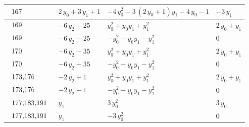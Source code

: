 \begin{table}[H]
\begin{center}
{\begin{tabular}{|l|l|l|l|}
$\begin{tabular}{l}
167 \\
\end{tabular}$ & $ 2 \, y_{0} + 3 \, y_{1} + 1 $ & $ -4 \, y_{0}^{2} - 3 \, {\left(2 \, y_{0} + 1\right)} y_{1} - 4 \, y_{0} - 1 $ & $ -3 \, y_{1} $ \\ \hline
$\begin{tabular}{l}
169 \\
\end{tabular}$ & $ -6 \, y_{2} + 25 $ & $ y_{0}^{2} + y_{0} y_{1} + y_{1}^{2} $ & $ 2 \, y_{0} + y_{1} $ \\ \hline
$\begin{tabular}{l}
169 \\
\end{tabular}$ & $ -6 \, y_{2} - 25 $ & $ -y_{0}^{2} - y_{0} y_{1} - y_{1}^{2} $ & $ 0 $ \\ \hline
$\begin{tabular}{l}
170 \\
\end{tabular}$ & $ -6 \, y_{2} - 35 $ & $ y_{0}^{2} + y_{0} y_{1} + y_{1}^{2} $ & $ 2 \, y_{0} + y_{1} $ \\ \hline
$\begin{tabular}{l}
170 \\
\end{tabular}$ & $ -6 \, y_{2} + 35 $ & $ -y_{0}^{2} - y_{0} y_{1} - y_{1}^{2} $ & $ 0 $ \\ \hline
$\begin{tabular}{l}
173,176 \\
\end{tabular}$ & $ -2 \, y_{2} + 1 $ & $ y_{0}^{2} + y_{0} y_{1} + y_{1}^{2} $ & $ 2 \, y_{0} + y_{1} $ \\ \hline
$\begin{tabular}{l}
173,176 \\
\end{tabular}$ & $ -2 \, y_{2} - 1 $ & $ -y_{0}^{2} - y_{0} y_{1} - y_{1}^{2} $ & $ 0 $ \\ \hline
$\begin{tabular}{l}
177,183,191 \\
\end{tabular}$ & $ y_{1} $ & $ 3 \, y_{0}^{2} $ & $ 3 \, y_{0} $ \\ \hline
$\begin{tabular}{l}
177,183,191 \\
\end{tabular}$ & $ y_{1} $ & $ -3 \, y_{0}^{2} $ & $ 0 $ \\ \hline

\end{tabular}}
\end{center}
\end{table}
